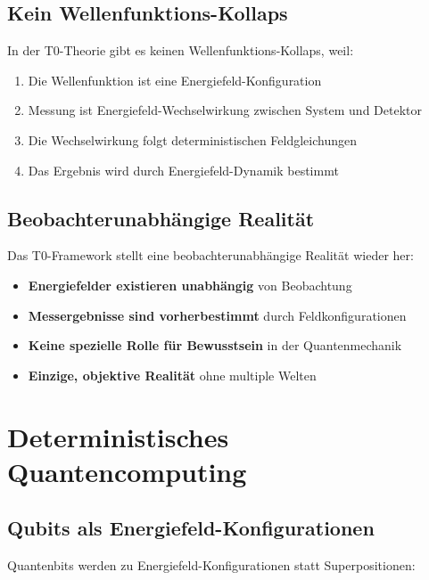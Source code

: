 \documentclass[12pt,a4paper]{report}
\begin{document}
	\subsection{Kein Wellenfunktions-Kollaps}
	\label{subsec:no_collapse}
	
	In der T0-Theorie gibt es keinen Wellenfunktions-Kollaps, weil:
	
	\begin{enumerate}
		\item Die Wellenfunktion ist eine Energiefeld-Konfiguration
		\item Messung ist Energiefeld-Wechselwirkung zwischen System und Detektor
		\item Die Wechselwirkung folgt deterministischen Feldgleichungen
		\item Das Ergebnis wird durch Energiefeld-Dynamik bestimmt
	\end{enumerate}
	
	\subsection{Beobachterunabhängige Realität}
	\label{subsec:observer_independent_reality}
	
	Das T0-Framework stellt eine beobachterunabhängige Realität wieder her:
	
	\begin{itemize}
		\item \textbf{Energiefelder existieren unabhängig} von Beobachtung
		\item \textbf{Messergebnisse sind vorherbestimmt} durch Feldkonfigurationen
		\item \textbf{Keine spezielle Rolle für Bewusstsein} in der Quantenmechanik
		\item \textbf{Einzige, objektive Realität} ohne multiple Welten
	\end{itemize}
	
	\section{Deterministisches Quantencomputing}
	\label{sec:deterministic_quantum_computing}
	
	\subsection{Qubits als Energiefeld-Konfigurationen}
	\label{subsec:qubits_energy_fields}
	
	Quantenbits werden zu Energiefeld-Konfigurationen statt Superpositionen:
	
\end{document}
